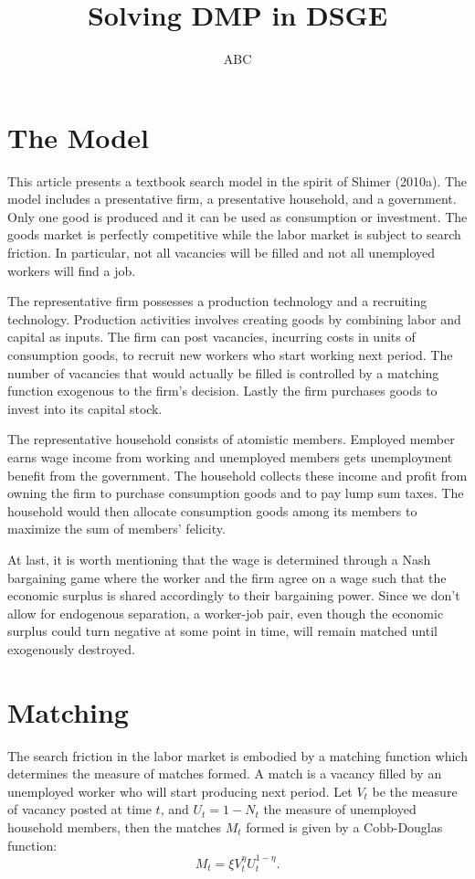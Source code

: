 \documentclass[12pt]{article}
\begin{document}
\title{Solving DMP in DSGE}
\author{ABC}
\maketitle

\section{The Model}
This article presents a textbook search model in the spirit of Shimer (2010a). The model includes a presentative firm, a presentative household, and a government. Only one good is produced and it can be used as consumption or investment. The goods market is perfectly competitive while the labor market is subject to search friction. In particular, not all vacancies will be filled and not all unemployed workers will find a job.

The representative firm possesses a production technology and a recruiting technology. Production activities involves creating goods by combining labor and capital as inputs. The firm can post vacancies, incurring costs in units of consumption goods, to recruit new workers who start working next period. The number of vacancies that would actually be filled is controlled by a matching function exogenous to the firm's decision. Lastly the firm purchases goods to invest into its capital stock.

The representative household consists of atomistic members. Employed member earns wage income from working and unemployed members gets unemployment benefit from the government. The household collects these income and profit from owning the firm to purchase consumption goods and to pay lump sum taxes. The household would then allocate consumption goods among its members to maximize the sum of members' felicity.

At last, it is worth mentioning that the wage is determined through a Nash bargaining game where the worker and the firm agree on a wage such that the economic surplus is shared accordingly to their bargaining power. Since we don't allow for endogenous separation, a worker-job pair, even though the economic surplus could turn negative at some point in time, will remain matched until exogenously destroyed.

\section{Matching}
The search friction in the labor market is embodied by a matching function which determines the measure of matches formed. A match is a vacancy filled by an unemployed worker who will start producing next period. Let $V_{t}$ be the measure of vacancy posted at time $t$, and $U_{t}=1-N_{t}$  the measure of unemployed household members, then the matches $M_{t}$ formed is given by a Cobb-Douglas function:
\[
M_{t} = \xi V_{t}^{\eta} U_{t}^{1-\eta}.
\]
\end{document}
